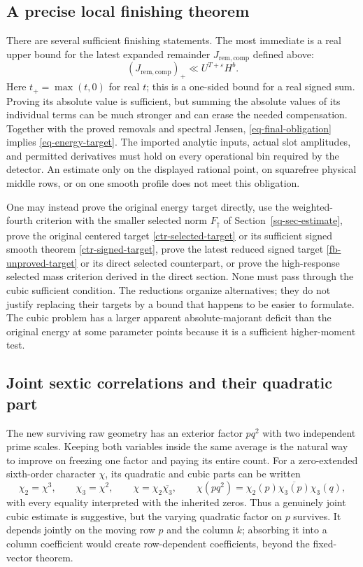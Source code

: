 \documentclass[11pt]{article}
\theoremstyle{definition}
\newcommand{\eps}{\varepsilon}
\begin{document}
\subsection{A precise local finishing theorem}
There are several sufficient finishing statements. The most immediate is a real upper bound for the latest expanded remainder $J_{\mathrm{rem,comp}}$ defined above:
\begin{equation}\label{eq-final-obligation}
 (J_{\mathrm{rem,comp}})_+\ll U^{T+\eps}H^b.
\end{equation}
Here $t_+=\max(t,0)$ for real $t$; this is a one-sided bound for a real signed sum. Proving its absolute value is sufficient, but summing the absolute values of its individual terms can be much stronger and can erase the needed compensation. Together with the proved removals and spectral Jensen, \eqref{eq-final-obligation} implies \eqref{eq-energy-target}. The imported analytic inputs, actual slot amplitudes, and permitted derivatives must hold on every operational bin required by the detector. An estimate only on the displayed rational point, on squarefree physical middle rows, or on one smooth profile does not meet this obligation.

One may instead prove the original energy target directly, use the weighted-fourth criterion with the smaller selected norm $F_\dagger$ of Section~\ref{sq-sec-estimate}, prove the original centered target \eqref{ctr-selected-target} or its sufficient signed smooth theorem \eqref{ctr-signed-target}, prove the latest reduced signed target \eqref{fb-unproved-target} or its direct selected counterpart, or prove the high-response selected mass criterion derived in the direct section. None must pass through the cubic sufficient condition. The reductions organize alternatives; they do not justify replacing their targets by a bound that happens to be easier to formulate. The cubic problem has a larger apparent absolute-majorant deficit than the original energy at some parameter points because it is a sufficient higher-moment test.

\subsection{Joint sextic correlations and their quadratic part}
The new surviving raw geometry has an exterior factor $pq^2$ with two independent prime scales. Keeping both variables inside the same average is the natural way to improve on freezing one factor and paying its entire count. For a zero-extended sixth-order character $\chi$, its quadratic and cubic parts can be written
\[
 \chi_2=\chi^3,\qquad \chi_3=\chi^2,\qquad
 \chi=\chi_2\overline{\chi_3},\qquad
 \chi(pq^2)=\chi_2(p)\overline{\chi_3(p)}\chi_3(q),
\]
with every equality interpreted with the inherited zeros. Thus a genuinely joint cubic estimate is suggestive, but the varying quadratic factor on $p$ survives. It depends jointly on the moving row $p$ and the column $k$; absorbing it into a column coefficient would create row-dependent coefficients, beyond the fixed-vector theorem.
\end{document}
